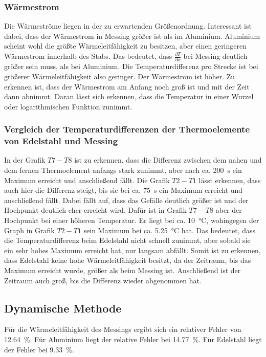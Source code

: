 \subsubsection{Wärmestrom}
Die Wärmeströme liegen in der zu erwartenden Größenordnung. Interessant ist dabei, dass der Wärmestrom in Messing größer ist als im Aluminium. 
Aluminium scheint wohl die größte Wärmeleitfähigkeit zu besitzen, aber einen geringeren Wärmestrom innerhalb des Stabs.
Das bedeutet, dass $\frac{\partial T}{\partial x}$ bei Messing deutlich größer sein muss, als bei Aluminium.
Die Temperaturdifferenz pro Strecke ist bei größerer Wärmeleitfähigkeit also geringer. Der Wärmestrom ist höher. %
Zu erkennen ist, dass der Wärmestrom am Anfang noch groß ist und mit der Zeit dann abnimmt. Daran lässt sich erkennen, dass die Temperatur 
in einer Wurzel oder logarithmischen Funktion zunimmt.

\subsubsection{Vergleich der Temperaturdifferenzen der Thermoelemente von Edelstahl und Messing}
In der Grafik $T7-T8$ ist zu erkennen, dass die Differenz zwischen dem nahen und dem fernen Thermoelement anfangs stark zunimmt, aber nach ca. 
\SI{200}{\second} ein Maximum erreicht und anschließend fällt. Die Grafik $T2-T1$ lässt erkennen, dass auch hier die 
Differenz steigt, bis sie bei ca. \SI{75}{\second} ein Maximum erreicht und anschließend fällt.
Dabei fällt auf, dass das Gefälle deutlich größer ist und der Hochpunkt deutlich eher erreicht wird. Dafür ist in Grafik 
$T7-T8$ aber der Hochpunkt bei einer höheren Temperatur. Er liegt bei ca. \SI{10}{\degreeCelsius}, wohingegen der Graph in Grafik $T2-T1$ sein
Maximum bei ca. \SI{5.25}{\degreeCelsius} hat. Das bedeutet, dass die Temperaturdifferenz beim Edelstahl nicht schnell zunimmt, aber sobald sie ein 
sehr hohes Maximum erreicht hat, nur langsam abfällt. Somit ist zu erkennen, dass Edelstahl keine hohe Wärmeleitfähigkeit besitzt, da der Zeitraum, bis das Maximum erreicht wurde, größer als beim Messing ist. Anschließend ist der Zeitraum auch groß, bis die Differenz wieder abgenommen hat.

\subsection{Dynamische Methode}
Für die Wärmeleitfähigkeit des Messings ergibt sich ein relativer Fehler von \SI{12.64}{\percent}. Für Aluminium liegt der relative 
Fehler bei \SI{14.77}{\percent}. Für Edelstahl liegt der Fehler bei \SI{9.33}{\percent}. 

